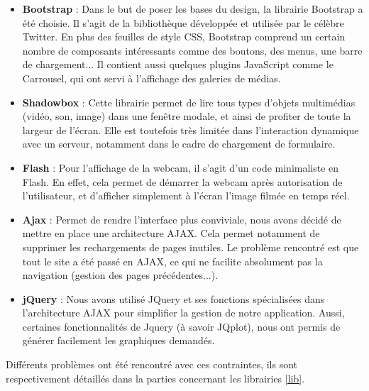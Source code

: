\documentclass[twoside]{EPURapport}
\begin{document}
	\begin{itemize}
		\item \textbf{Bootstrap} : Dans le but de poser les bases du design, la librairie Bootstrap a été choisie. Il s'agit de la bibliothèque développée et utilisée par le célèbre Twitter. En plus des feuilles de style CSS, Bootstrap comprend un certain nombre de composants intéressants comme des boutons, des menus, une barre de chargement... Il contient aussi quelques plugins JavaScript comme le Carrousel, qui ont servi à l'affichage des galeries de médias.\\
		
		\item \textbf{Shadowbox} : Cette librairie permet de lire tous types d'objets multimédias (vidéo, son, image) dans une fenêtre modale, et ainsi de profiter de toute la largeur de l'écran. Elle est toutefois très limitée dans l'interaction dynamique avec un serveur, notamment dans le cadre de chargement de formulaire.\\
		
		\item \textbf{Flash} : Pour l'affichage de la webcam, il s'agit d'un code minimaliste en Flash. En effet, cela permet de démarrer la webcam après autorisation de l'utilisateur, et d'afficher simplement à l'écran l'image filmée en temps réel.\\
		
		\item \textbf{Ajax} : Permet de rendre l'interface plus conviviale, nous avons décidé de mettre en place une architecture AJAX. Cela permet notamment de supprimer les rechargements de pages inutiles. Le problème rencontré est que tout le site a été passé en AJAX, ce qui ne facilite absolument pas la navigation (gestion des pages précédentes...).\\
		
		\item \textbf{jQuery} : Nous avons utilisé JQuery et ses fonctions spécialisées dans l'architecture AJAX pour simplifier la gestion de notre application. Aussi, certaines fonctionnalités de Jquery (à savoir JQplot), nous ont permis de générer facilement les graphiques demandés.\\
	\end{itemize}
	
	Différents problèmes ont été rencontré avec ces contraintes, ils sont respectivement détaillés dans la parties concernant les librairies \ref{lib}.
\end{document}
